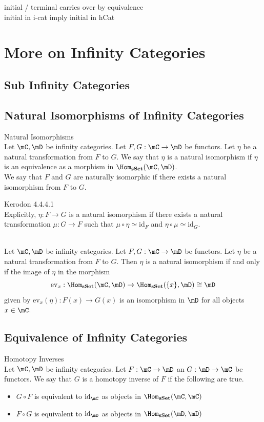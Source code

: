 \documentclass[a4paper]{article}
\begin{document}
initial / terminal carries over by equivalence\\

initial in i-cat imply initial in hCat

\pagebreak
\section{More on Infinity Categories}
\subsection{Sub Infinity Categories}

\subsection{Natural Isomorphisms of Infinity Categories}
\begin{defn}{Natural Isomorphisms}{}\\ Let $\mC,\mD$ be infinity categories. Let $F,G:\mC\to\mD$ be functors. Let $\eta$ be a natural transformation from $F$ to $G$. We say that $\eta$ is a natural isomorphism if $\eta$ is an equivalence as a morphism in $\Hom_\bold{sSet}(\mC,\mD)$. \\

We say that $F$ and $G$ are naturally isomorphic if there exists a natural isomorphism from $F$ to $G$. 
\end{defn}

Kerodon 4.4.4.1\\

Explicitly, $\eta:F\to G$ is a natural isomorphism if there exists a natural transformation $\mu:G\to F$ such that $\mu\circ\eta\simeq\text{id}_F$ and $\eta\circ\mu\simeq\text{id}_G$. 

\begin{prp}{}{}\\ Let $\mC,\mD$ be infinity categories. Let $F,G:\mC\to\mD$ be functors. Let $\eta$ be a natural transformation from $F$ to $G$. Then $\eta$ is a natural isomorphism if and only if the image of $\eta$ in the morphism $$\text{ev}_x:\Hom_\bold{sSet}(\mC,\mD)\to\Hom_\bold{sSet}(\{x\},\mD)\cong\mD$$ given by $\text{ev}_x(\eta):F(x)\to G(x)$ is an isomorphism in $\mD$ for all objects $x\in\mC$. 
\end{prp}

\subsection{Equivalence of Infinity Categories}
\begin{defn}{Homotopy Inverses}{}\\ Let $\mC,\mD$ be infinity categories. Let $F:\mC\to\mD$ an $G:\mD\to\mC$ be functors. We say that $G$ is a homotopy inverse of $F$ if the following are true. 
\begin{itemize}
\item $G\circ F$ is equivalent to $\text{id}_\mC$ as objects in $\Hom_\bold{sSet}(\mC,\mC)$
\item $F\circ G$ is equivalent to $\text{id}_\mD$ as objects in $\Hom_\bold{sSet}(\mD,\mD)$
\end{itemize}
\end{defn}
\end{document}
